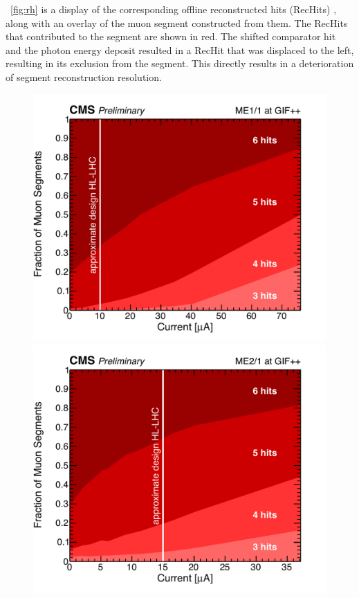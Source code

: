 \Fig~\ref{fig:rh} is a display of the corresponding offline reconstructed hits (RecHits) \cite{Barashko:2007zz}, along with an overlay of the muon segment constructed from them. The RecHits that contributed to the segment are shown in red. The shifted comparator hit and the photon energy deposit resulted in a RecHit that was displaced to the left, resulting in its exclusion from the segment. This directly results in a deterioration of segment reconstruction resolution.

\begin{figure}[htbp]
	\centering
	\includegraphics[width=.7\dummyFigWidth]{figures/neutron/SegNHitsFrac_ME11_all.pdf}
	\includegraphics[width=.7\dummyFigWidth]{figures/neutron/SegNHitsFrac_ME21_all.pdf}

\end{figure}
